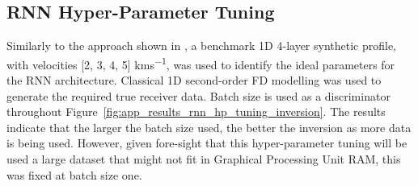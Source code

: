 


\subsection{RNN Hyper-Parameter Tuning}\label{sec:app_results_rnn_hp_tuning}
Similarly to the approach shown in \cite{Sun2019}, a benchmark 1D 4-layer synthetic profile, with velocities [2, 3, 4, 5] \si{kms^{-1}}, was used to identify the ideal parameters for the RNN architecture. Classical 1D second-order \ac{FD} modelling was used to generate the required true receiver data. Batch size is used as a discriminator throughout Figure~\ref{fig:app_results_rnn_hp_tuning_inversion}. The results indicate that the larger the batch size used, the better the inversion as more data is being used. However, given fore-sight that this hyper-parameter tuning will be used a large dataset that might not fit in Graphical Processing Unit RAM, this was fixed at batch size one. 

